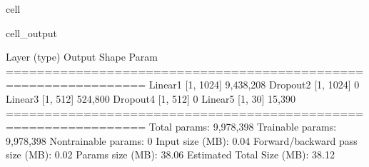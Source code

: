 \documentclass[letterpaper,10pt,english]{jupyterBook}
\begin{document}
\begin{sphinxuseclass}{cell}
\begin{sphinxVerbatimOutput}
\begin{sphinxuseclass}{cell_output}
\begin{sphinxVerbatim}[commandchars=\\\{\}]
\PYGZhy{}\PYGZhy{}\PYGZhy{}\PYGZhy{}\PYGZhy{}\PYGZhy{}\PYGZhy{}\PYGZhy{}\PYGZhy{}\PYGZhy{}\PYGZhy{}\PYGZhy{}\PYGZhy{}\PYGZhy{}\PYGZhy{}\PYGZhy{}\PYGZhy{}\PYGZhy{}\PYGZhy{}\PYGZhy{}\PYGZhy{}\PYGZhy{}\PYGZhy{}\PYGZhy{}\PYGZhy{}\PYGZhy{}\PYGZhy{}\PYGZhy{}\PYGZhy{}\PYGZhy{}\PYGZhy{}\PYGZhy{}\PYGZhy{}\PYGZhy{}\PYGZhy{}\PYGZhy{}\PYGZhy{}\PYGZhy{}\PYGZhy{}\PYGZhy{}\PYGZhy{}\PYGZhy{}\PYGZhy{}\PYGZhy{}\PYGZhy{}\PYGZhy{}\PYGZhy{}\PYGZhy{}\PYGZhy{}\PYGZhy{}\PYGZhy{}\PYGZhy{}\PYGZhy{}\PYGZhy{}\PYGZhy{}\PYGZhy{}\PYGZhy{}\PYGZhy{}\PYGZhy{}\PYGZhy{}\PYGZhy{}\PYGZhy{}\PYGZhy{}\PYGZhy{}
        Layer (type)               Output Shape         Param \PYGZsh{}
================================================================
            Linear\PYGZhy{}1                 [\PYGZhy{}1, 1024]       9,438,208
           Dropout\PYGZhy{}2                 [\PYGZhy{}1, 1024]               0
            Linear\PYGZhy{}3                  [\PYGZhy{}1, 512]         524,800
           Dropout\PYGZhy{}4                  [\PYGZhy{}1, 512]               0
            Linear\PYGZhy{}5                   [\PYGZhy{}1, 30]          15,390
================================================================
Total params: 9,978,398
Trainable params: 9,978,398
Non\PYGZhy{}trainable params: 0
\PYGZhy{}\PYGZhy{}\PYGZhy{}\PYGZhy{}\PYGZhy{}\PYGZhy{}\PYGZhy{}\PYGZhy{}\PYGZhy{}\PYGZhy{}\PYGZhy{}\PYGZhy{}\PYGZhy{}\PYGZhy{}\PYGZhy{}\PYGZhy{}\PYGZhy{}\PYGZhy{}\PYGZhy{}\PYGZhy{}\PYGZhy{}\PYGZhy{}\PYGZhy{}\PYGZhy{}\PYGZhy{}\PYGZhy{}\PYGZhy{}\PYGZhy{}\PYGZhy{}\PYGZhy{}\PYGZhy{}\PYGZhy{}\PYGZhy{}\PYGZhy{}\PYGZhy{}\PYGZhy{}\PYGZhy{}\PYGZhy{}\PYGZhy{}\PYGZhy{}\PYGZhy{}\PYGZhy{}\PYGZhy{}\PYGZhy{}\PYGZhy{}\PYGZhy{}\PYGZhy{}\PYGZhy{}\PYGZhy{}\PYGZhy{}\PYGZhy{}\PYGZhy{}\PYGZhy{}\PYGZhy{}\PYGZhy{}\PYGZhy{}\PYGZhy{}\PYGZhy{}\PYGZhy{}\PYGZhy{}\PYGZhy{}\PYGZhy{}\PYGZhy{}\PYGZhy{}
Input size (MB): 0.04
Forward/backward pass size (MB): 0.02
Params size (MB): 38.06
Estimated Total Size (MB): 38.12
\PYGZhy{}\PYGZhy{}\PYGZhy{}\PYGZhy{}\PYGZhy{}\PYGZhy{}\PYGZhy{}\PYGZhy{}\PYGZhy{}\PYGZhy{}\PYGZhy{}\PYGZhy{}\PYGZhy{}\PYGZhy{}\PYGZhy{}\PYGZhy{}\PYGZhy{}\PYGZhy{}\PYGZhy{}\PYGZhy{}\PYGZhy{}\PYGZhy{}\PYGZhy{}\PYGZhy{}\PYGZhy{}\PYGZhy{}\PYGZhy{}\PYGZhy{}\PYGZhy{}\PYGZhy{}\PYGZhy{}\PYGZhy{}\PYGZhy{}\PYGZhy{}\PYGZhy{}\PYGZhy{}\PYGZhy{}\PYGZhy{}\PYGZhy{}\PYGZhy{}\PYGZhy{}\PYGZhy{}\PYGZhy{}\PYGZhy{}\PYGZhy{}\PYGZhy{}\PYGZhy{}\PYGZhy{}\PYGZhy{}\PYGZhy{}\PYGZhy{}\PYGZhy{}\PYGZhy{}\PYGZhy{}\PYGZhy{}\PYGZhy{}\PYGZhy{}\PYGZhy{}\PYGZhy{}\PYGZhy{}\PYGZhy{}\PYGZhy{}\PYGZhy{}\PYGZhy{}
\end{sphinxVerbatim}

\end{sphinxuseclass}\end{sphinxVerbatimOutput}

\end{sphinxuseclass}
\sphinxAtStartPar
{}
\end{document}
